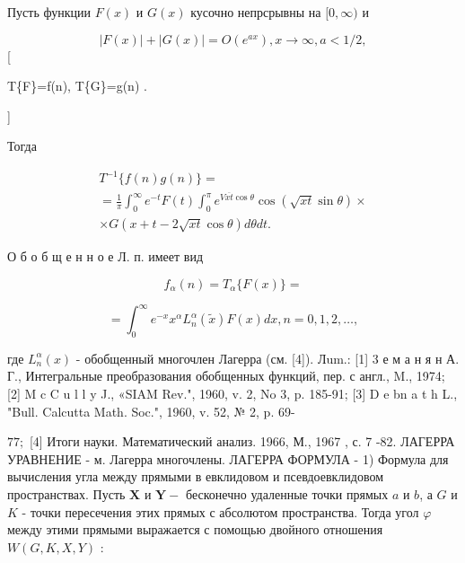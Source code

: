 \documentclass[10pt]{article}
\begin{document}
Пусть функции $F(x)$ и $G(x)$ кусочно непрсрывны на $[0, \infty)$ и



\[

|F(x)|+|G(x)|=O\left(e^{a x}\right), x \rightarrow \infty, a<1 / 2,

\][



T\{F\}=f(n), T\{G\}=g(n) .

]



Тогда



\[

\begin{gathered}

T^{-1}\{f(n) g(n)\}= \\

=\frac{1}{\pi} \int_{0}^{\infty} e^{-t} F(t) \int_{0}^{\pi} e^{V \overline{x t} \cos \theta} \cos (\sqrt{x t} \sin \theta) \times \\

\times G(x+t-2 \sqrt{x t} \cos \theta) d \theta d t .

\end{gathered}

\]



О б о б щ е н н о е Л. п. имеет вид



\[

f_{\alpha}(n)=T_{\alpha}\{F(x)\}=

\]



\[

=\int_{0}^{\infty} e^{-x} x^{\alpha} L_{n}^{\alpha}(\tilde{x}) F(x) d x, n=0,1,2, \ldots,

\]



где $L_{n}^{\alpha}(x)$ - обобщенный многочлен Лагерра (см. [4]). Лum.: [1] 3 е м а н я н А. Г., Интегральные преобразования обобщенных функций, пер. с англ., M., 1974; [2] M c C u l l y J., «SIAM Rev.", 1960, v. 2, No 3, p. 185-91; [3] D e bn a t h L., "Bull. Calcutta Math. Soc.", 1960, v. 52, № 2, p. 69-

$77 ;$ [4] Итоги науки. Математический анализ. 1966, М., 1967 , с. 7 -82. ЛАГЕРРА УРАВНЕНИЕ - м. Лагерра многочлены. ЛАГЕРРА ФОРМУЛА - 1) Формула для вычисления угла между прямыми в евклидовом и псевдоевклидовом пространствах. Пусть $\boldsymbol{X}$ и $\boldsymbol{Y}-$ бесконечно удаленные точки прямых $a$ и $b$, а $G$ и $K$ - точки пересечения этих прямых с абсолютом пространства. Тогда угол $\varphi$ между этими прямыми выражается с помощью двойного отношения $W(G, K, X, Y)$ :
\end{document}

